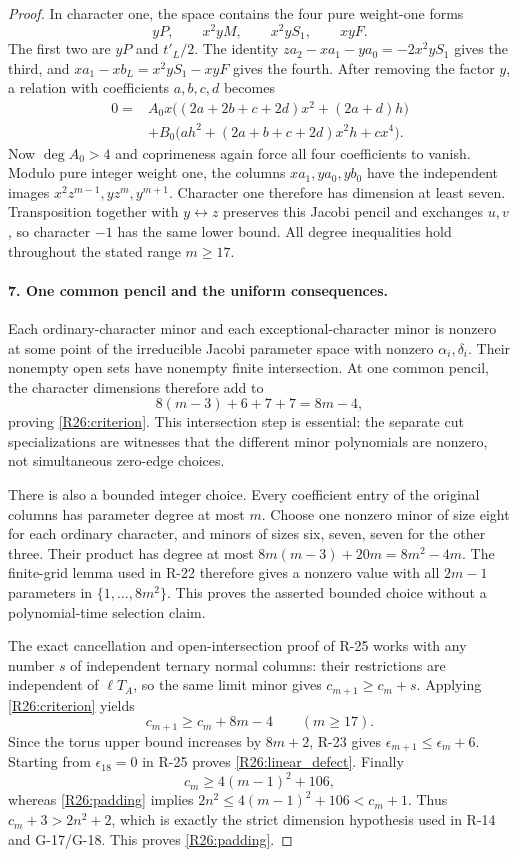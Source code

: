 \begin{proof}
In character one, the space contains the four pure weight-one
forms
\begin{equation}\label{R26:one_basis}
 yP,\qquad x^2yM,\qquad x^2yS_1,\qquad xyF.
\end{equation}
The first two are $yP$ and $t'_L/2$. The identity
$za_2-xa_1-ya_0=-2x^2yS_1$ gives the third, and
$xa_1-xb_L=x^2yS_1-xyF$ gives the fourth.
After removing the factor $y$, a relation with coefficients
$a,b,c,d$ becomes
\begin{align*}
0={}&A_0x\big((2a+2b+c+2d)x^2+(2a+d)h\big)\\
 &+B_0\big(ah^2+(2a+b+c+2d)x^2h+cx^4\big).
\end{align*}
Now $\deg A_0>4$ and coprimeness again force all four
coefficients to vanish. Modulo pure integer weight one, the
columns $xa_1,ya_0,yb_0$ have the independent images
$x^2z^{m-1},yz^m,y^{m+1}$. Character one therefore has dimension
at least seven. Transposition together with $y\leftrightarrow z$
preserves this Jacobi pencil and exchanges $u,v$, so character
$-1$ has the same lower bound. All degree inequalities hold
throughout the stated range $m\geq17$.

\paragraph{7. One common pencil and the uniform consequences.}
Each ordinary-character minor and each exceptional-character
minor is nonzero at some point of the irreducible Jacobi parameter
space with nonzero $\alpha_i,\delta_i$. Their nonempty open
sets have nonempty finite intersection. At one common pencil,
the character dimensions therefore add to
\[
 8(m-3)+6+7+7=8m-4,
\]
proving \eqref{R26:criterion}. This intersection step is essential:
the separate cut specializations are witnesses that the different
minor polynomials are nonzero, not simultaneous zero-edge choices.

There is also a bounded integer choice. Every coefficient entry
of the original columns has parameter degree at most $m$.
Choose one nonzero minor of size eight for each ordinary
character, and minors of sizes six, seven, seven for the other
three. Their product has degree at most
$8m(m-3)+20m=8m^2-4m$. The finite-grid lemma used in R-22
therefore gives a nonzero value with all $2m-1$ parameters in
$\{1,\ldots,8m^2\}$. This proves the asserted bounded choice
without a polynomial-time selection claim.

The exact cancellation and open-intersection proof of R-25 works
with any number $s$ of independent ternary normal columns:
their restrictions are independent of $\ell T_A$, so the same
limit minor gives $c_{m+1}\geq c_m+s$. Applying
\eqref{R26:criterion} yields
\[
 c_{m+1}\geq c_m+8m-4\qquad(m\geq17).
\]
Since the torus upper bound increases by $8m+2$, R-23 gives
$\epsilon_{m+1}\leq\epsilon_m+6$.
Starting from $\epsilon_{18}=0$ in R-25 proves
\eqref{R26:linear_defect}. Finally
\[
 c_m\geq4(m-1)^2+106,
\]
whereas \eqref{R26:padding} implies
$2n^2\leq4(m-1)^2+106<c_m+1$. Thus $c_m+3>2n^2+2$,
which is exactly the strict dimension hypothesis used in R-14
and G-17/G-18. This proves \eqref{R26:padding}.
\end{proof}


